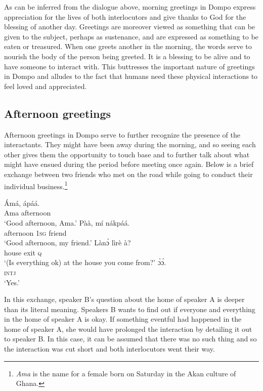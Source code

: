 \documentclass[output=paper,colorlinks,citecolor=brown]{langscibook}
\begin{document}
As can be inferred from the dialogue above, morning greetings in Dompo express appreciation for the lives of both interlocutors and give thanks to God for the blessing of another day. Greetings are moreover viewed as something that can be given to the subject, perhaps as sustenance, and are expressed as something to be eaten or treasured. When one greets another in the morning, the words serve to nourish the body of the person being greeted. It is a blessing to be alive and to have someone to interact with. This buttresses the important nature of greetings in Dompo and alludes to the fact that humans need these physical interactions to feel loved and appreciated. 

\subsection{Afternoon greetings}\largerpage

Afternoon greetings in Dompo serve to further recognize the presence of the interactants. They might have been away during the morning, and so seeing each other gives them the opportunity to touch base and to further talk about what might have ensued during the period before meeting once again. Below is a brief exchange between two friends who met on the road while going to conduct their individual business.\footnote{\textit{Ama} is the name for a female born on Saturday in the Akan culture of Ghana.} 

\ea \label{ex:afternoongreet}
\begin{xlist}
\ex 
 \gll Ámá, 	ápáá.\\
	Ama	afternoon\\
\glt  ‘Good afternoon, Ama.’ 
\ex
\gll Pàà,		mí	nákpáá.\\
	afternoon	\textsc{1sg}	friend\\
\glt  ‘Good afternoon, my friend.’
\ex 
 \gll Lànɔ̀	lìrè	à?\\
	house	exit	\textsc{q}\\
\glt  ‘(Is everything ok) at the house you come from?’ 
\ex
\gll  ɔ̀ɔ́.\\
	\textsc{intj}\\
\glt  ‘Yes.’ 
\end{xlist}
\z

In this exchange, speaker B’s question about the home of speaker A is deeper than its literal meaning. Speakers B wants to find out if everyone and everything in the home of speaker A is okay. If something eventful had happened in the home of speaker A, she would have prolonged the interaction by detailing it out to speaker B. In this case, it can be assumed that there was no such thing and so the interaction was cut short and both interlocutors went their way. 
\end{document}

